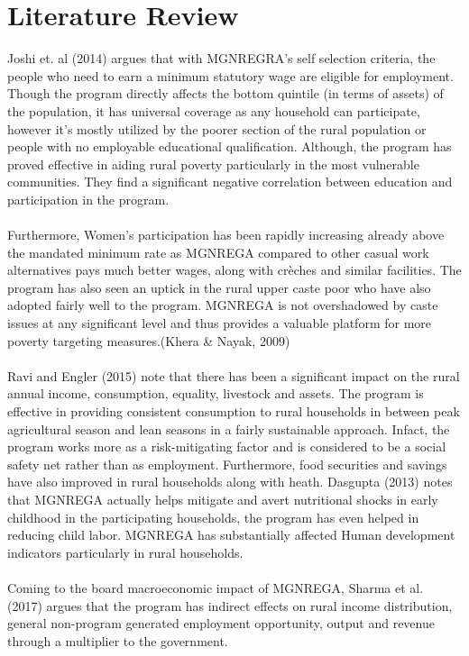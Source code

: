 \documentclass{article}
\begin{document}
\section{Literature Review}
\label{lit}
Joshi et. al (2014) argues that with MGNREGRA’s self selection criteria, the people who need to earn a minimum statutory wage are eligible for employment. Though the program directly affects the bottom quintile (in terms of assets) of the population, it has universal coverage as any household can participate, however it's mostly utilized by the poorer section of the rural population or people with no employable educational qualification. Although, the program has proved effective in aiding rural poverty particularly in the most vulnerable communities. They find a significant negative correlation between education and participation in the program. 
\\
\\
Furthermore, Women’s participation has been rapidly increasing already above the mandated minimum rate as MGNREGA compared to other casual work alternatives pays much better wages, along with crèches and similar facilities. The program has also seen an uptick in the rural upper caste poor who have also adopted fairly well to the program. MGNREGA is not overshadowed by caste issues at any significant level and thus provides a valuable platform for more poverty targeting measures.(Khera \& Nayak, 2009) 
\\
\\
Ravi and Engler (2015) note that there has been a significant impact on the rural annual income, consumption, equality, livestock and assets. The program is effective in providing consistent consumption to rural households in between peak agricultural season and lean seasons in a fairly sustainable approach. Infact, the program works more as a risk-mitigating factor and is considered to be a social safety net rather than as employment. Furthermore, food securities and savings have also improved in rural households along with heath. Dasgupta (2013) notes that MGNREGA actually helps mitigate and avert nutritional shocks in early childhood in the participating households, the program has even helped in reducing child labor. MGNREGA has substantially affected Human development indicators particularly in rural households.  
\\
\\
Coming to the board macroeconomic impact of MGNREGA, Sharma et al. (2017) argues that the program has indirect effects on rural income distribution, general non-program generated employment opportunity, output and revenue through a multiplier to the government.  \\
\end{document}
